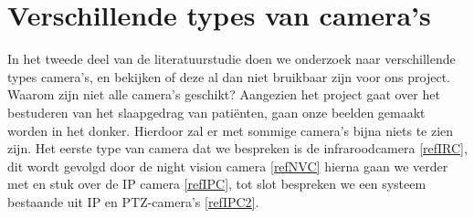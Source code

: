\section{Verschillende types van camera's}
\label{refTVC}
In het tweede deel van de literatuurstudie doen we onderzoek naar verschillende types camera's, en bekijken of deze al dan niet bruikbaar zijn voor ons project. Waarom zijn niet alle camera's geschikt? Aangezien het project gaat over het bestuderen van het slaapgedrag van pati\"enten, gaan onze beelden gemaakt worden in het donker. Hierdoor zal er met sommige camera's bijna niets te zien zijn. Het eerste type van camera dat we bespreken is de infraroodcamera \ref{refIRC}, dit wordt gevolgd door de night vision camera \ref{refNVC} hierna gaan we verder met en stuk over de IP camera \ref{refIPC}, tot slot bespreken we een systeem bestaande uit IP en PTZ-camera's \ref{refIPC2}.

